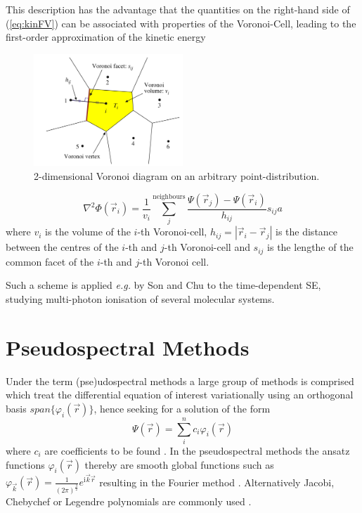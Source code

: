 This description has the advantage that the quantities on the right-hand side of (\ref{eq:kinFV}) can be associated with properties of the Voronoi-Cell, leading to the first-order approximation of the kinetic energy
\begin{figure}
   \includegraphics[width=0.5\textwidth]{Figures/VoronoiFD}
   \caption{2-dimensional Voronoi diagram on an arbitrary point-distribution. \cite{Son_Chu}}
   \label{fig:VorCell}
\end{figure}
\begin{equation}\label{eq:kinVoron}
   \nabla^2\Phi(\vec{r}_i)=\frac{1}{v_i} \sum_j^\text{neighbours} \frac{\Psi(\vec{r}_j)-\Psi(\vec{r}_i)}{h_{ij}} s_{ij}a
\end{equation}
where $v_i$ is the volume of the $i$-th Voronoi-cell, $h_{ij}=|\vec{r}_i-\vec{r}_j|$ is the distance between the centres of the $i$-th and $j$-th Voronoi-cell and $s_{ij}$ is the lengthe of the common facet of the $i$-th and $j$-th Voronoi cell.

Such a scheme is applied \textit{e.g.} by Son and Chu \cite{Son_Chu0, Son_Chu} to the time-dependent SE, studying multi-photon ionisation of several molecular systems.

\section{Pseudospectral Methods}
\label{ch:dvr}
Under the term (pse)udospectral methods a large group of methods is comprised which treat the differential equation of interest variationally using an orthogonal basis $span\{\varphi_i(\vec{r})\}$, hence seeking for a solution of the form
\begin{equation}
\Psi(\vec{r})=\sum_i^n c_i \varphi_i(\vec{r})
\end{equation}
where $c_i$ are coefficients to be found \cite{SpectMeth}.
In the pseudospectral methods the ansatz functions $\varphi_i(\vec{r})$ thereby are smooth global functions such as $\varphi_{\vec{k}}(\vec{r})=\frac{1}{(2\pi)^\frac 32 }e^{\text{i}\vec{k}\vec{r}}$ resulting in the Fourier method \cite{Fourier}.
Alternatively Jacobi, Chebychef or Legendre polynomials are commonly used \cite{PSbook}.

